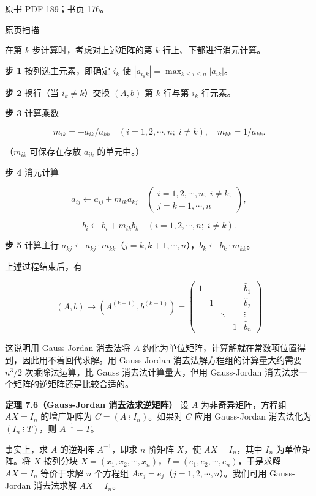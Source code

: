 \documentclass[
  10pt,
  fontset=fandol]{ctexart}
\begin{document}
\clearpage

原书 PDF 189；书页 176。

\href{/Users/xiangjunfeng/Desktop/数值计算专用/numerical-analysis/book/source-images/pdf-189.jpeg}{原页扫描}

在第 \(k\) 步计算时，考虑对上述矩阵的第 \(k\) 行上、下都进行消元计算。

\textbf{步 1} 按列选主元素，即确定 \(i_k\) 使 \(|a_{i_kk}|=\max_{k\le i\le n}|a_{ik}|\)。

\textbf{步 2} 换行（当 \(i_k\ne k\)）交换 \((A,b)\) 第 \(k\) 行与第 \(i_k\) 行元素。

\textbf{步 3} 计算乘数

\[m_{ik}=-a_{ik}/a_{kk}\quad(i=1,2,\cdots,n;\;i\ne k),\quad m_{kk}=1/a_{kk}.\]

（\(m_{ik}\) 可保存在存放 \(a_{ik}\) 的单元中。）

\textbf{步 4} 消元计算

\[a_{ij}\leftarrow a_{ij}+m_{ik}a_{kj}\quad
\left(\begin{array}{l}i=1,2,\cdots,n;\;i\ne k;\\j=k+1,\cdots,n\end{array}\right),\]

\[b_i\leftarrow b_i+m_{ik}b_k\quad(i=1,2,\cdots,n;\;i\ne k).\]

\textbf{步 5} 计算主行 \(a_{kj}\leftarrow a_{kj}\cdot m_{kk}\)（\(j=k,k+1,\cdots,n\)），\(b_k\leftarrow b_k\cdot m_{kk}\)。

上述过程结束后，有

\[
(A,b)\to(A^{(k+1)},b^{(k+1)})=
\left(\begin{array}{cccc|c}
1&&&&\widehat{b}_1\\
&1&&&\widehat{b}_2\\
&&\ddots&&\vdots\\
&&&1&\widehat{b}_n
\end{array}\right)
\]

这说明用 Gauss-Jordan 消去法将 \(A\) 约化为单位矩阵，计算解就在常数项位置得到，因此用不着回代求解。用 Gauss-Jordan 消去法解方程组的计算量大约需要 \(n^3/2\) 次乘除法运算，比 Gauss 消去法计算量大，但用 Gauss-Jordan 消去法求一个矩阵的逆矩阵还是比较合适的。

\textbf{定理 7.6（Gauss-Jordan 消去法求逆矩阵）} 设 \(A\) 为非奇异矩阵，方程组 \(AX=I_n\) 的增广矩阵为 \(C=(A\mathbin{\vdots}I_n)\)。如果对 \(C\) 应用 Gauss-Jordan 消去法化为 \((I_n\mathbin{\vdots}T)\)，则 \(A^{-1}=T\)。

事实上，求 \(A\) 的逆矩阵 \(A^{-1}\)，即求 \(n\) 阶矩阵 \(X\)，使 \(AX=I_n\)，其中 \(I_n\) 为单位矩阵。将 \(X\) 按列分块 \(X=(x_1,x_2,\cdots,x_n)\)，\(I=(e_1,e_2,\cdots,e_n)\)，于是求解 \(AX=I_n\) 等价于求解 \(n\) 个方程组 \(Ax_j=e_j\)（\(j=1,2,\cdots,n\)）。我们可用 Gauss-Jordan 消去法求解 \(AX=I_n\)。
\end{document}
